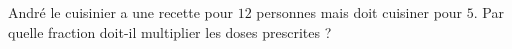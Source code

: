 
\begin{exercice}\label{exosmath-0881}

    André le cuisinier a une recette pour \( 12\) personnes mais doit cuisiner pour \( 5\). Par quelle fraction doit-il multiplier les doses prescrites ?

\end{exercice}
